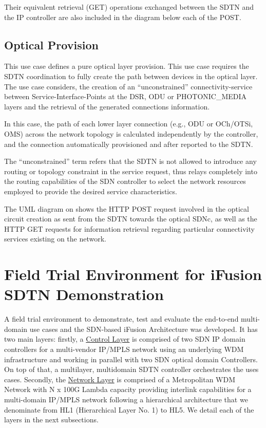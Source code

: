 \documentclass[a4paper,fleqn]{cas-dc}
\begin{document}
Their equivalent retrieval (GET) operations exchanged between the SDTN and the IP controller are also included in the diagram below each of the POST.

\subsection{Optical Provision}
\label{section:optical_provision}

This use case defines a pure optical layer provision. This use case requires the SDTN coordination to fully create the path between devices in the optical layer. The use case considers, the creation of an “unconstrained” connectivity-service between Service-Interface-Points at the DSR, ODU or PHOTONIC\_MEDIA layers and the retrieval of the generated connections information.

In this case, the path of each lower layer connection (e.g., ODU or OCh/OTSi, OMS) across the network topology is calculated independently by the controller, and the connection automatically provisioned and after reported to the SDTN. 

The “unconstrained” term refers that the SDTN is not allowed to introduce any routing or topology constraint in the service request, thus relays completely into the routing capabilities of the SDN controller to select the network resources employed to provide the desired service characteristics.

The UML diagram on  shows the HTTP POST request involved in the optical circuit creation as sent from the SDTN towards the optical SDNc, as well as the HTTP GET requests for information retrieval regarding particular connectivity services existing on the network. 

\section{Field Trial Environment for iFusion SDTN Demonstration}
\label{section:trial}

A field trial environment to demonstrate, test and evaluate the end-to-end multi-domain use cases and the SDN-based iFusion Architecture was developed. It has two main layers: firstly, a \hyperref[sec:contollay]{Control Layer} is comprised of two SDN IP domain controllers for a multi-vendor IP/MPLS network using an underlying WDM infrastructure and working in parallel with two SDN optical domain Controllers. On top of that, a multi\-layer, multi\-domain SDTN controller orchestrates the uses cases. Secondly, the \hyperref[sec:netlay]{Network Layer} is comprised of a Metropolitan WDM Network with N x 100G Lambda capacity providing interlink capabilities for a multi-domain IP/MPLS network following a hierarchical architecture that we denominate from HL1 (Hierarchical Layer No. 1) to HL5. We detail each of the layers in the next subsections. 
\end{document}
